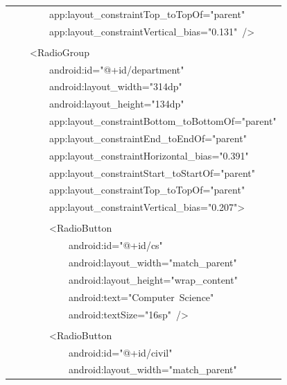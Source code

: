 \documentclass[a4paper,12pt]{article}
\begin{document}
\begin{longtable}{|p{}|}
{\ttfamily\small \ \ \ \ \ \ \ \ app:layout\_constraintTop\_toTopOf="parent"} \\
{\ttfamily\small \ \ \ \ \ \ \ \ app:layout\_constraintVertical\_bias="0.131"\ /\textgreater{}} \\
\strut \\
{\ttfamily\small \ \ \ \ \textless{}RadioGroup} \\
{\ttfamily\small \ \ \ \ \ \ \ \ android:id="@+id/department"} \\
{\ttfamily\small \ \ \ \ \ \ \ \ android:layout\_width="314dp"} \\
{\ttfamily\small \ \ \ \ \ \ \ \ android:layout\_height="134dp"} \\
{\ttfamily\small \ \ \ \ \ \ \ \ app:layout\_constraintBottom\_toBottomOf="parent"} \\
{\ttfamily\small \ \ \ \ \ \ \ \ app:layout\_constraintEnd\_toEndOf="parent"} \\
{\ttfamily\small \ \ \ \ \ \ \ \ app:layout\_constraintHorizontal\_bias="0.391"} \\
{\ttfamily\small \ \ \ \ \ \ \ \ app:layout\_constraintStart\_toStartOf="parent"} \\
{\ttfamily\small \ \ \ \ \ \ \ \ app:layout\_constraintTop\_toTopOf="parent"} \\
{\ttfamily\small \ \ \ \ \ \ \ \ app:layout\_constraintVertical\_bias="0.207"\textgreater{}} \\
\strut \\
{\ttfamily\small \ \ \ \ \ \ \ \ \textless{}RadioButton} \\
{\ttfamily\small \ \ \ \ \ \ \ \ \ \ \ \ android:id="@+id/cs"} \\
{\ttfamily\small \ \ \ \ \ \ \ \ \ \ \ \ android:layout\_width="match\_parent"} \\
{\ttfamily\small \ \ \ \ \ \ \ \ \ \ \ \ android:layout\_height="wrap\_content"} \\
{\ttfamily\small \ \ \ \ \ \ \ \ \ \ \ \ android:text="Computer\ Science"} \\
{\ttfamily\small \ \ \ \ \ \ \ \ \ \ \ \ android:textSize="16sp"\ /\textgreater{}} \\
\strut \\
{\ttfamily\small \ \ \ \ \ \ \ \ \textless{}RadioButton} \\
{\ttfamily\small \ \ \ \ \ \ \ \ \ \ \ \ android:id="@+id/civil"} \\
{\ttfamily\small \ \ \ \ \ \ \ \ \ \ \ \ android:layout\_width="match\_parent"} \\

\end{longtable}
\end{document}
